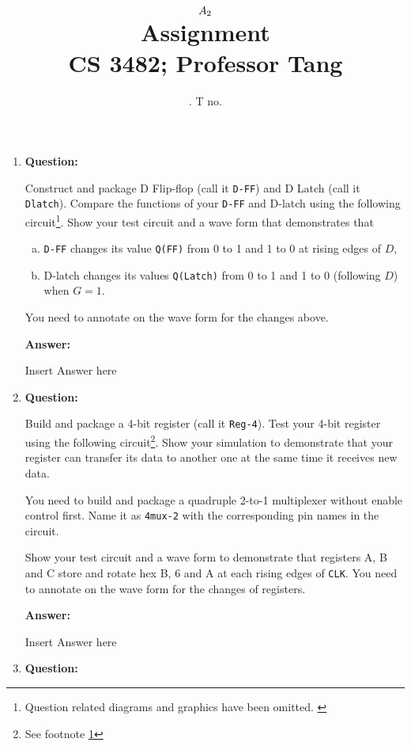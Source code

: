 \documentclass[11pt]{article}
\title{
	$A_{2}$ \\
	{\large Assignment \ass\\
	CS 3482; Professor Tang}
}
\author{
	\name. T no. \tno
}
\begin{document}
\maketitle

\begin{enumerate}
\item{
	{\bf Question:}

	Construct and package D Flip-flop (call it {\tt D-FF}) and D Latch
	(call it {\tt Dlatch}).
	Compare the functions of your {\tt D-FF} and D-latch using the following
	circuit\footnote{
		Question related diagrams and graphics have been omitted. \label{qfoot}
	}.
	Show your test circuit and a wave form that demonstrates that
	\begin{enumerate}[(a)]
		\item{
			{\tt D-FF} changes its value {\tt Q(FF)} from 0 to 1 and 1 to 0 at
			rising edges of $D$,
		}\item{
			D-latch changes its values {\tt Q(Latch)} from 0 to 1 and 1 to 0
			(following $D$) when $G = 1$.
		}
	\end{enumerate}
	You need to annotate on the wave form for the changes above.

	{\bf Answer:}



	Insert Answer here
}

\item{
	{\bf Question:}

	Build and package a 4-bit register (call it {\tt Reg-4}).
	Test your 4-bit register using the following
	circuit\footnote{See footnote \ref{qfoot}}.
	Show your simulation to demonstrate that your register can transfer its
	data to another one at the same time it receives new data.

	You need to build and package a quadruple 2-to-1 multiplexer without
	enable control first.
	Name it as {\tt 4mux-2} with the corresponding pin names in the circuit.

	Show your test circuit and a wave form to demonstrate that
	registers A, B and C store and rotate
	hex B, 6 and A at each rising edges of {\tt CLK}.
	You need to annotate on the wave form for the changes of registers.

	{\bf Answer:}

	Insert Answer here
}

\item{
	{\bf Question:}

}
\end{enumerate}
\end{document}

